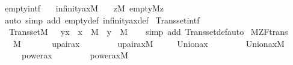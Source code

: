 \begin{isabellebody}
\isanewline
{}\isamarkupfalse%
\ empty{\isacharunderscore}{\kern0pt}intf\ {\isacharcolon}{\kern0pt}\isanewline
\ \ {\isachardoublequoteopen}infinity{\isacharunderscore}{\kern0pt}ax{\isacharparenleft}{\kern0pt}M{\isacharparenright}{\kern0pt}\ {\isasymLongrightarrow}\isanewline
\ \ {\isacharparenleft}{\kern0pt}{\isasymexists}z{\isacharbrackleft}{\kern0pt}M{\isacharbrackright}{\kern0pt}{\isachardot}{\kern0pt}\ empty{\isacharparenleft}{\kern0pt}M{\isacharcomma}{\kern0pt}z{\isacharparenright}{\kern0pt}{\isacharparenright}{\kern0pt}{\isachardoublequoteclose}\isanewline
%
\isadelimproof
\ \ %
\endisadelimproof
%
\isatagproof
{}\isamarkupfalse%
\ {\isacharparenleft}{\kern0pt}auto\ simp\ add{\isacharcolon}{\kern0pt}\ empty{\isacharunderscore}{\kern0pt}def\ infinity{\isacharunderscore}{\kern0pt}ax{\isacharunderscore}{\kern0pt}def{\isacharparenright}{\kern0pt}%
\endisatagproof
{\isafoldproof}%
%
\isadelimproof
\isanewline
%
\endisadelimproof
\isanewline
{}\isamarkupfalse%
\ Transset{\isacharunderscore}{\kern0pt}intf\ {\isacharcolon}{\kern0pt}\isanewline
\ \ {\isachardoublequoteopen}Transset{\isacharparenleft}{\kern0pt}M{\isacharparenright}{\kern0pt}\ {\isasymLongrightarrow}\ \ y{\isasymin}x\ {\isasymLongrightarrow}\ x\ {\isasymin}\ M\ {\isasymLongrightarrow}\ y\ {\isasymin}\ M{\isachardoublequoteclose}\isanewline
%
\isadelimproof
\ \ %
\endisadelimproof
%
\isatagproof
{}\isamarkupfalse%
\ {\isacharparenleft}{\kern0pt}simp\ add{\isacharcolon}{\kern0pt}\ Transset{\isacharunderscore}{\kern0pt}def{\isacharcomma}{\kern0pt}auto{\isacharparenright}{\kern0pt}%
\endisatagproof
{\isafoldproof}%
%
\isadelimproof
\isanewline
%
\endisadelimproof
\isanewline
{}\isamarkupfalse%
\ M{\isacharunderscore}{\kern0pt}ZF{\isacharunderscore}{\kern0pt}trans\ {\isacharequal}{\kern0pt}\isanewline
\ \ \ M\isanewline
\ \ \isanewline
\ \ \ \ upair{\isacharunderscore}{\kern0pt}ax{\isacharcolon}{\kern0pt}\ \ \ \ \ \ \ \ \ {\isachardoublequoteopen}upair{\isacharunderscore}{\kern0pt}ax{\isacharparenleft}{\kern0pt}{\isacharhash}{\kern0pt}{\isacharhash}{\kern0pt}M{\isacharparenright}{\kern0pt}{\isachardoublequoteclose}\isanewline
\ \ \ \ \ Union{\isacharunderscore}{\kern0pt}ax{\isacharcolon}{\kern0pt}\ \ \ \ \ \ \ \ \ {\isachardoublequoteopen}Union{\isacharunderscore}{\kern0pt}ax{\isacharparenleft}{\kern0pt}{\isacharhash}{\kern0pt}{\isacharhash}{\kern0pt}M{\isacharparenright}{\kern0pt}{\isachardoublequoteclose}\isanewline
\ \ \ \ \ power{\isacharunderscore}{\kern0pt}ax{\isacharcolon}{\kern0pt}\ \ \ \ \ \ \ \ \ {\isachardoublequoteopen}power{\isacharunderscore}{\kern0pt}ax{\isacharparenleft}{\kern0pt}{\isacharhash}{\kern0pt}{\isacharhash}{\kern0pt}M{\isacharparenright}{\kern0pt}{\isachardoublequoteclose}\isanewline

\end{isabellebody}
